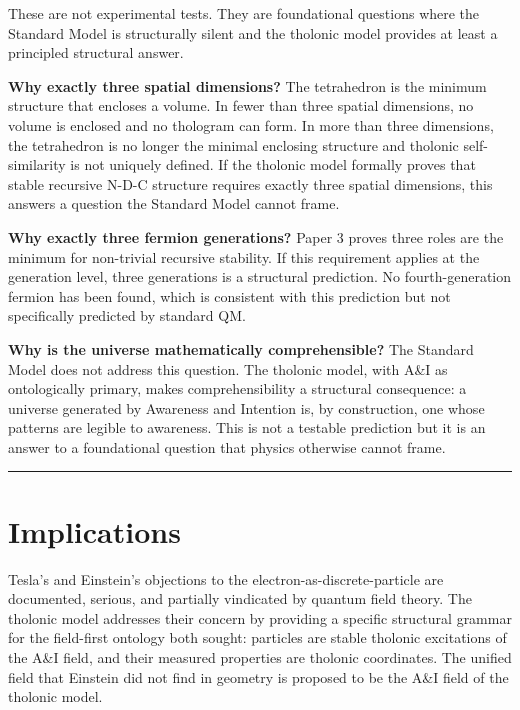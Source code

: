 \documentclass[12pt]{article}
\begin{document}
These are not experimental tests. They are foundational questions where
the Standard Model is structurally silent and the tholonic model
provides at least a principled structural answer.

\textbf{Why exactly three spatial dimensions?} The tetrahedron is the
minimum structure that encloses a volume. In fewer than three spatial
dimensions, no volume is enclosed and no thologram can form. In more
than three dimensions, the tetrahedron is no longer the minimal
enclosing structure and tholonic self-similarity is not uniquely
defined. If the tholonic model formally proves that stable recursive
N-D-C structure requires exactly three spatial dimensions, this answers
a question the Standard Model cannot frame.

\textbf{Why exactly three fermion generations?} Paper 3 proves three
roles are the minimum for non-trivial recursive stability. If this
requirement applies at the generation level, three generations is a
structural prediction. No fourth-generation fermion has been found,
which is consistent with this prediction but not specifically predicted
by standard QM.

\textbf{Why is the universe mathematically comprehensible?} The Standard
Model does not address this question. The tholonic model, with A\&I as
ontologically primary, makes comprehensibility a structural consequence:
a universe generated by Awareness and Intention is, by construction, one
whose patterns are legible to awareness. This is not a testable
prediction but it is an answer to a foundational question that physics
otherwise cannot frame.

\begin{center}\rule{0.5\linewidth}{0.5pt}\end{center}

\section{Implications}\label{implications}

Tesla's and Einstein's objections to the electron-as-discrete-particle
are documented, serious, and partially vindicated by quantum field
theory. The tholonic model addresses their concern by providing a
specific structural grammar for the field-first ontology both sought:
particles are stable tholonic excitations of the A\&I field, and their
measured properties are tholonic coordinates. The unified field that
Einstein did not find in geometry is proposed to be the A\&I field of
the tholonic model.
\end{document}
